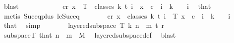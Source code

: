 \begin{isabellebody}
\ blast\isanewline
\ \ \ \ \isamarkupfalse%
\isanewline
\ \ \ \ \isamarkupfalse%
\ \isamarkupfalse%
\ {\isachardoublequoteopen}{\isasymexists}c{\isacharless}{\kern0pt}r{\isachardot}{\kern0pt}\ {\isasymforall}x\ {\isasymin}\ T\ {\isacharbackquote}{\kern0pt}\ classes\ {\isacharparenleft}{\kern0pt}k{\isacharplus}{\kern0pt}{}{\isacharparenright}{\kern0pt}\ t\ i{\isachardot}{\kern0pt}\ {\isasymchi}\ x\ {\isacharequal}{\kern0pt}\ c{\isachardoublequoteclose}\ \ {\isachardoublequoteopen}i\ {\isasymle}\ k\ {\isacharplus}{\kern0pt}\ {}{\isachardoublequoteclose}\ \ i\ \isamarkupfalse%
\ that\ \isamarkupfalse%
\ {\isacharparenleft}{\kern0pt}metis\ Suc{\isacharunderscore}{\kern0pt}eq{\isacharunderscore}{\kern0pt}plus{}\ le{\isacharunderscore}{\kern0pt}Suc{\isacharunderscore}{\kern0pt}eq{\isacharparenright}{\kern0pt}\isanewline
\ \ \ \ \isamarkupfalse%
\ \isamarkupfalse%
\ {\isachardoublequoteopen}{\isasymexists}c{\isacharless}{\kern0pt}r{\isachardot}{\kern0pt}\ {\isasymforall}x\ {\isasymin}\ classes\ {\isacharparenleft}{\kern0pt}k{\isacharplus}{\kern0pt}{}{\isacharparenright}{\kern0pt}\ t\ i{\isachardot}{\kern0pt}\ {\isasymchi}\ {\isacharparenleft}{\kern0pt}T\ x{\isacharparenright}{\kern0pt}\ {\isacharequal}{\kern0pt}\ c{\isachardoublequoteclose}\ \ {\isachardoublequoteopen}i\ {\isasymle}\ k\ {\isacharplus}{\kern0pt}\ {}{\isachardoublequoteclose}\ \ i\ \isamarkupfalse%
\ that\ \isamarkupfalse%
\ simp\isanewline
\ \ \ \ \isamarkupfalse%
\ \isamarkupfalse%
\ {\isachardoublequoteopen}layered{\isacharunderscore}{\kern0pt}subspace\ T\ {\isacharparenleft}{\kern0pt}k{\isacharplus}{\kern0pt}{}{\isacharparenright}{\kern0pt}\ {\isacharparenleft}{\kern0pt}n\ {\isacharplus}{\kern0pt}\ m{\isacharparenright}{\kern0pt}\ t\ r\ {\isasymchi}{\isachardoublequoteclose}\ \ \isamarkupfalse%
\ subspace{\isacharunderscore}{\kern0pt}T\ that{\isacharparenleft}{\kern0pt}{}{\isacharparenright}{\kern0pt}\ {\isacartoucheopen}n\ {\isacharplus}{\kern0pt}\ m\ {\isacharequal}{\kern0pt}\ M{\isacharprime}{\kern0pt}{\isacartoucheclose}\ \isamarkupfalse%
\ layered{\isacharunderscore}{\kern0pt}subspace{\isacharunderscore}{\kern0pt}def\ \isamarkupfalse%
\ blast\isanewline
\ \ \ \isamarkupfalse%
\ \isamarkupfalse%

\end{isabellebody}
